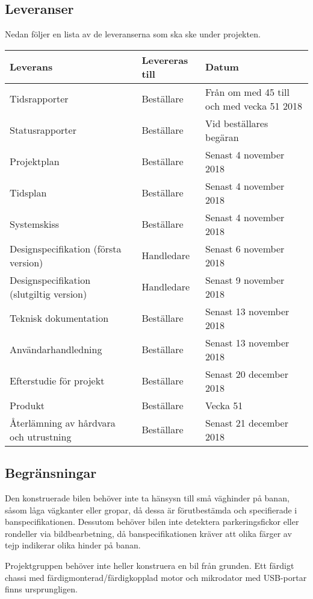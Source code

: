 \documentclass[projektplan/plan.tex]{subfiles}
\begin{document}
\noindent
\begin{minipage}{\textwidth}
\subsection{Leveranser}
\label{sec:doc}
Nedan följer en lista av de leveranserna som ska ske under projekten.
{\renewcommand{\arraystretch}{1.6}
\begin{longtable} {p{7cm}p{3cm}p{5cm}}

    \bfseries Leverans &
    \bfseries Levereras till &
    \bfseries Datum  \\\hline 
    Tidsrapporter &
    Beställare &
    Från om med 45 till och med vecka 51 2018
    \\
    Statusrapporter &
    Beställare &
    Vid beställares begäran
    \\
    Projektplan &
    Beställare &
    Senast 4 november 2018
    \\
    Tidsplan &
    Beställare &
    Senast 4 november 2018
    \\
    Systemskiss  &
    Beställare &
    Senast 4 november 2018
    \\
    Designspecifikation (första version) &
    Handledare &
    Senast 6 november 2018
    \\
    Designspecifikation (slutgiltig version) &
    Handledare &
    Senast 9 november 2018
    \\
    Teknisk dokumentation &
    Beställare &
    Senast 13 november 2018
    \\
    Användarhandledning &
    Beställare &
    Senast 13 november 2018
    \\
    Efterstudie för projekt &
    Beställare &
    Senast 20 december 2018
    \\ 
    Produkt &
    Beställare &
    Vecka 51
    \\   
    Återlämning av hårdvara och utrustning &
    Beställare &
    Senast 21 december 2018
    \\

    \endhead
\end{longtable}}
\end{minipage}

\subsection{Begränsningar}
Den konstruerade bilen behöver inte ta hänsysn till små väghinder på banan,
såsom låga vägkanter eller gropar, då dessa är förutbestämda och specifierade i
banspecifikationen. Dessutom behöver bilen inte detektera parkeringsfickor
eller rondeller via bildbearbetning, då banspecifikationen kräver att olika
färger av tejp indikerar olika hinder på banan.

Projektgruppen behöver inte heller konstruera en bil från grunden. Ett färdigt
chassi med färdigmonterad/färdigkopplad motor och mikrodator med
USB-portar finns ursprungligen. 
\end{document}
